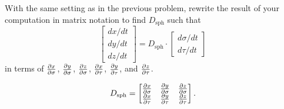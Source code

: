 \documentclass[newpage,hints,handout]{ximera}
\begin{document}
\begin{problem}
  With the same setting as in the previous problem, rewrite the result
  of your computation in matrix notation to find $D_{\mathrm{sph}}$ such
  that
\[
\begin{bmatrix}
dx/dt\\ dy/dt \\ dz/dt
\end{bmatrix}
= D_{\mathrm{sph}} \cdot
\begin{bmatrix}
d\sigma/dt \\ d\tau/dt
\end{bmatrix}
\]
in terms of $\pp[x]{\sigma}$, $\pp[y]{\sigma}$, $\pp[z]{\sigma}$,
$\pp[x]{\tau}$, $\pp[y]{\tau}$, and $\pp[z]{\tau}$.
\begin{freeResponse}
  \[
  D_{\mathrm{sph}} =
  \begin{bmatrix}
    \pp[x]{\sigma} & \pp[y]{\sigma} & \pp[z]{\sigma} \\
    \pp[x]{\tau}   & \pp[y]{\tau}   & \pp[z]{\tau}
  \end{bmatrix}.
  \]
\end{freeResponse}
\end{problem}
\end{document}
